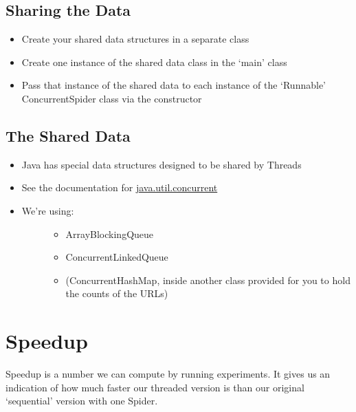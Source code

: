 \documentclass[letterpaper,10pt,openany,oneside]{sphinxmanual}
\begin{document}
\subsection{Sharing the Data}
\label{URLSpider/URLSpider:sharing-the-data}\begin{itemize}
\item {} 
Create your shared data structures in a separate class

\item {} 
Create one instance of the shared data class in the ‘main’ class

\item {} 
Pass that instance of the shared data to each instance of the `Runnable' ConcurrentSpider class via the constructor

\end{itemize}


\subsection{The Shared Data}
\label{URLSpider/URLSpider:the-shared-data}\begin{itemize}
\item {} 
Java has special data structures designed to be shared by Threads

\item {} 
See the documentation for \href{http://java.sun.com/j2se/1.5.0/docs/api/java/util/concurrent/package-summary.html}{java.util.concurrent}

\item {} \begin{description}
\item[{We’re using:}] \leavevmode\begin{itemize}
\item {} 
ArrayBlockingQueue

\item {} 
ConcurrentLinkedQueue

\item {} 
(ConcurrentHashMap, inside another class provided for you to hold the counts of the URLs)

\end{itemize}

\end{description}

\end{itemize}


\section{Speedup}
\label{URLSpider/URLSpider:java-util-concurrent}\label{URLSpider/URLSpider:speedup}
Speedup is a number we can compute by running experiments.  It gives us an indication of how much faster
our threaded version is than our original `sequential' version with one Spider.
\end{document}
